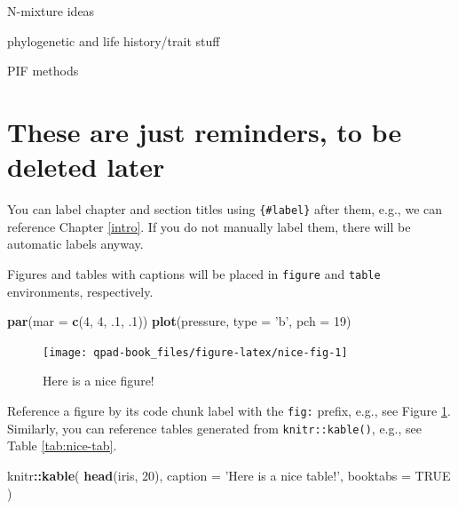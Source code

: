 \documentclass[12pt,]{book}
\newenvironment{Shaded}{\begin{snugshade}}{\end{snugshade}}
\newcommand{\DataTypeTok}[1]{\textcolor[rgb]{0.13,0.29,0.53}{#1}}
\newcommand{\DecValTok}[1]{\textcolor[rgb]{0.00,0.00,0.81}{#1}}
\newcommand{\FloatTok}[1]{\textcolor[rgb]{0.00,0.00,0.81}{#1}}
\newcommand{\KeywordTok}[1]{\textcolor[rgb]{0.13,0.29,0.53}{\textbf{#1}}}
\newcommand{\NormalTok}[1]{#1}
\newcommand{\OperatorTok}[1]{\textcolor[rgb]{0.81,0.36,0.00}{\textbf{#1}}}
\newcommand{\OtherTok}[1]{\textcolor[rgb]{0.56,0.35,0.01}{#1}}
\newcommand{\StringTok}[1]{\textcolor[rgb]{0.31,0.60,0.02}{#1}}
\begin{document}
N-mixture ideas

phylogenetic and life history/trait stuff

PIF methods

\hypertarget{these-are-just-reminders-to-be-deleted-later}{%
\section*{These are just reminders, to be deleted later}\label{these-are-just-reminders-to-be-deleted-later}}

You can label chapter and section titles using \texttt{\{\#label\}} after them, e.g., we can reference Chapter \ref{intro}. If you do not manually label them, there will be automatic labels anyway.

Figures and tables with captions will be placed in \texttt{figure} and \texttt{table} environments, respectively.

\begin{Shaded}
\begin{Highlighting}[]
\KeywordTok{par}\NormalTok{(}\DataTypeTok{mar =} \KeywordTok{c}\NormalTok{(}\DecValTok{4}\NormalTok{, }\DecValTok{4}\NormalTok{, }\FloatTok{.1}\NormalTok{, }\FloatTok{.1}\NormalTok{))}
\KeywordTok{plot}\NormalTok{(pressure, }\DataTypeTok{type =} \StringTok{'b'}\NormalTok{, }\DataTypeTok{pch =} \DecValTok{19}\NormalTok{)}
\end{Highlighting}
\end{Shaded}

\begin{figure}

{\centering \texttt{[image: qpad-book\_files/figure-latex/nice-fig-1]} 

}

\caption{Here is a nice figure!}\label{fig:nice-fig}
\end{figure}

Reference a figure by its code chunk label with the \texttt{fig:} prefix, e.g., see Figure \ref{fig:nice-fig}. Similarly, you can reference tables generated from \texttt{knitr::kable()}, e.g., see Table \ref{tab:nice-tab}.

\begin{Shaded}
\begin{Highlighting}[]
\NormalTok{knitr}\OperatorTok{::}\KeywordTok{kable}\NormalTok{(}
  \KeywordTok{head}\NormalTok{(iris, }\DecValTok{20}\NormalTok{), }\DataTypeTok{caption =} \StringTok{'Here is a nice table!'}\NormalTok{,}
  \DataTypeTok{booktabs =} \OtherTok{TRUE}
\NormalTok{)}
\end{Highlighting}
\end{Shaded}
\end{document}
